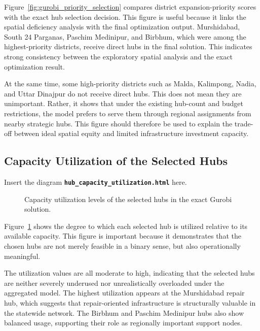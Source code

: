 Figure~\ref{fig:gurobi_priority_selection} compares district expansion-priority scores with the exact hub selection decision. This figure is useful because it links the spatial deficiency analysis with the final optimization output. Murshidabad, South 24 Parganas, Paschim Medinipur, and Birbhum, which were among the highest-priority districts, receive direct hubs in the final solution. This indicates strong consistency between the exploratory spatial analysis and the exact optimization result.

At the same time, some high-priority districts such as Malda, Kalimpong, Nadia, and Uttar Dinajpur do not receive direct hubs. This does not mean they are unimportant. Rather, it shows that under the existing hub-count and budget restrictions, the model prefers to serve them through regional assignments from nearby strategic hubs. This figure should therefore be used to explain the trade-off between ideal spatial equity and limited infrastructure investment capacity.

\subsection{Capacity Utilization of the Selected Hubs}

Insert the diagram \textbf{\texttt{hub\_capacity\_utilization.html}} here.

\begin{figure}[h!]
\centering
\caption{Capacity utilization levels of the selected hubs in the exact Gurobi solution.}
\label{fig:gurobi_utilization}
\end{figure}

Figure~\ref{fig:gurobi_utilization} shows the degree to which each selected hub is utilized relative to its available capacity. This figure is important because it demonstrates that the chosen hubs are not merely feasible in a binary sense, but also operationally meaningful.

The utilization values are all moderate to high, indicating that the selected hubs are neither severely underused nor unrealistically overloaded under the aggregated model. The highest utilization appears at the Murshidabad repair hub, which suggests that repair-oriented infrastructure is structurally valuable in the statewide network. The Birbhum and Paschim Medinipur hubs also show balanced usage, supporting their role as regionally important support nodes.

